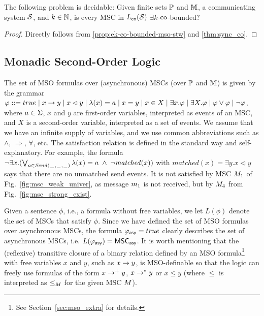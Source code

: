 \begin{theorem}\label{thm:sync_ek_co_bounded}
	The following problem is decidable: Given finite sets $\mathbb{P}$ and $\mathbb{M}$, a communicating system $\mathcal{S}$, and $k \in \mathbb{N}$, is every MSC in $L_{\mathsf{co}}(\mathcal{S})$ $\exists k$-$\mathsf{co}$-bounded?
\end{theorem}
\begin{proof}
	Directly follows from \ref{prop:ek-co-bounded-mso-stw} and \ref{thm:sync_co}.
\end{proof}

\subsection{Monadic Second-Order Logic}

The set of MSO formulas over (asynchronous) MSCs (over $\mathbb{P}$ and $\mathbb{M}$) is given by the grammar
$
\varphi ::= true \mid x \to y \mid x \lhd y \mid \lambda(x) = a \mid x = y \mid x \in X \mid \exists x.\varphi \mid \exists X.\varphi \mid \varphi \vee \varphi \mid \neg \varphi
$,
where $a \in \Sigma$, $x$ and $y$ are first-order variables, interpreted as
events of an MSC, and $X$ is a second-order variable, interpreted
as a set of events. We assume that we have an infinite supply of variables,
and we use common abbreviations such as $\wedge$, $\Rightarrow$, $\forall$, etc.
The satisfaction relation is defined in the standard way and self-explanatory.
For example, the formula $\neg\exists x.(\bigvee_{a \in {\mathit{Send}(\hspace{0.1em}\underline{\hspace{0.5em}}\hspace{0.1em},\hspace{0.1em}\underline{\hspace{0.5em}}\hspace{0.1em},\hspace{0.1em}\underline{\hspace{0.5em}}\hspace{0.1em})}} \lambda(x) = a \;\wedge\; \neg \mathit{matched}(x))$
with $\mathit{matched}(x) = \exists y.x \lhd y$
says that there are no unmatched send events.
It is not satisfied by  MSC $M_{1}$
of Fig.~\ref{fig:msc_weak_univer},
as message $m_1$ is not received,
but by $M_{4}$ from Fig.~\ref{fig:msc_strong_exist}.

Given a sentence $\phi$, i.e., a formula without free variables,
we let $L(\phi)$ denote the set of MSCs that satisfy $\phi$. Since we have defined the set of MSO formulas over asynchronous MSCs, the formula $\varphi_{\mathsf{asy}} = true$ clearly describes the set of asynchronous MSCs, i.e. $L(\varphi_{\mathsf{asy}}) = \mathsf{MSC}_{\mathsf{asy}}$. It is worth mentioning that the (reflexive) transitive closure of a binary relation defined by an MSO formula\footnote{See Section~\ref{sec:mso_extra} for details.} with free variables $x$ and $y$, such as $x \to y$, is MSO-definable so that the logic can freely use formulas of the form $x \to^+ y$, $x \to^* y$ or $x \le y$ (where $\le$ is interpreted as $\le_M$ for the given MSC $M$).

